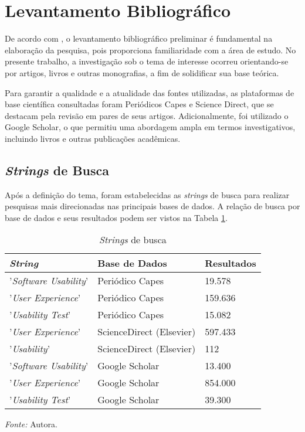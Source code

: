 \section{Levantamento Bibliográfico}
\label{sec:Levantamento Bibliografico}
De acordo com , o levantamento bibliográfico preliminar é fundamental na elaboração da pesquisa, pois proporciona familiaridade com a área de estudo. No presente trabalho, a investigação sob o tema de interesse ocorreu orientando-se por artigos, livros e outras monografias, a fim de solidificar sua base teórica.

Para garantir a qualidade e a atualidade das fontes utilizadas, as plataformas de base científica consultadas foram Periódicos Capes e Science Direct, que se destacam pela revisão em pares de seus artigos. Adicionalmente, foi utilizado o Google Scholar, o que permitiu uma abordagem ampla em termos investigativos, incluindo livros e outras publicações acadêmicas. 

\subsection{\textit{Strings} de Busca}
\label{sec:Strings de Busca}
Após a definição do tema, foram estabelecidas as \textit{strings} de busca para realizar pesquisas mais direcionadas nas principais bases de dados. A relação de busca por base de dados e seus resultados podem ser vistos na Tabela \ref{tab04}.

\begin{table}[h]
	\centering
	\caption{\textit{Strings} de busca}
	\begin{adjustbox}{center}
	\label{tab04}
	\begin{tabular}{l|l|l}
	\hline
	\textit{String}               & Base de Dados            & Resultados \\ \hline
	'\textit{Software Usability}' & Periódico Capes          & 19.578     \\ \hline
	'\textit{User Experience}'    & Periódico Capes          & 159.636    \\ \hline
	'\textit{Usability Test}'     & Periódico Capes          & 15.082     \\ \hline
	'\textit{User Experience}'    & ScienceDirect (Elsevier) & 597.433    \\ \hline
	'\textit{Usability}'          & ScienceDirect (Elsevier) & 112        \\ \hline
	'\textit{Software Usability}' & Google Scholar           & 13.400     \\ \hline
	'\textit{User Experience}'    & Google Scholar           & 854.000    \\ \hline
	'\textit{Usability Test}'     & Google Scholar           & 39.300     \\ \hline
	\end{tabular}
	\end{adjustbox}
	\begin{tablenotes}[flushleft]
		\centering
		\item \textit{Fonte:} Autora.
	\end{tablenotes}
\end{table}

